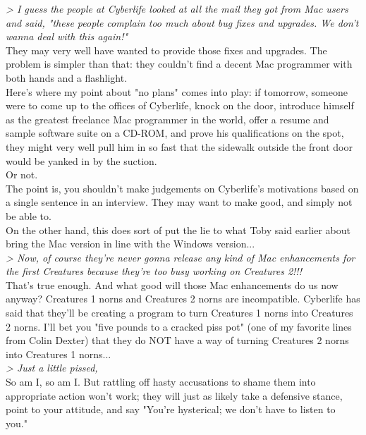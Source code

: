 \documentclass[11pt,twoside,a4paper]{article}
\begin{document}
\begin{multicols*}{2}
\emph{> I guess the people at Cyberlife looked at all the mail they got from Mac users and said, "these people complain too much about bug fixes and upgrades. We don't wanna deal with this again!"}~\\

They may very well have wanted to provide those fixes and upgrades. The problem is simpler than that: they couldn't find a decent Mac programmer with both hands and a flashlight.~\\

Here's where my point about "no plans" comes into play: if tomorrow, someone were to come up to the offices of Cyberlife, knock on the door, introduce himself as the greatest freelance Mac programmer in the world, offer a resume and sample software suite on a CD-ROM, and prove his qualifications on the spot, they might very well pull him in so fast that the sidewalk outside the front door would be yanked in by the suction.~\\

Or not.~\\

The point is, you shouldn't make judgements on Cyberlife's motivations based on a single sentence in an interview. They may want to make good, and simply not be able to.~\\

On the other hand, this does sort of put the lie to what Toby said earlier about bring the Mac version in line with the Windows version...~\\

\emph{> Now, of course they're never gonna release any kind of Mac enhancements for the first Creatures because they're too busy working on Creatures 2!!!}~\\

That's true enough. And what good will those Mac enhancements do us now anyway? Creatures 1 norns and Creatures 2 norns are incompatible. Cyberlife has said that they'll be creating a program to turn Creatures 1 norns into Creatures 2 norns. I'll bet you "five pounds to a cracked piss pot" (one of my favorite lines from Colin Dexter) that they do NOT have a way of turning Creatures 2 norns into Creatures 1 norns...~\\

\emph{> Just a little pissed,}~\\

So am I, so am I. But rattling off hasty accusations to shame them into appropriate action won't work; they will just as likely take a defensive stance, point to your attitude, and say "You're hysterical; we don't have to listen to you."~\\


\end{multicols*}
\end{document}
